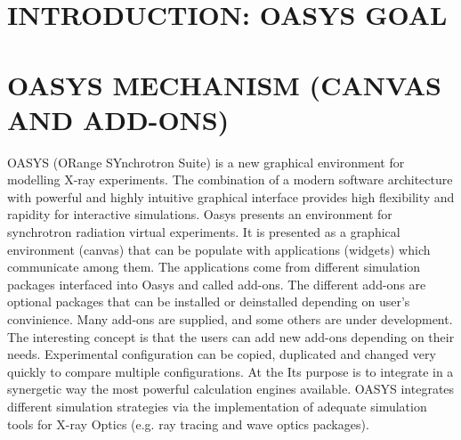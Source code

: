 \documentclass{aip-cp}
\begin{document}
\section{INTRODUCTION: OASYS GOAL}

\section{OASYS MECHANISM (CANVAS AND ADD-ONS)}
OASYS (ORange SYnchrotron Suite) \cite{mandel_wolf}  is a new graphical environment for modelling X-ray experiments. The combination of a modern  software architecture with powerful and highly intuitive graphical interface provides high flexibility and rapidity for interactive simulations. Oasys presents an environment for synchrotron radiation virtual experiments. It is presented as a graphical environment (canvas) that can be populate with applications (widgets) which communicate among them. The applications come from different simulation packages interfaced into Oasys and called add-ons. The different add-ons are optional packages that can be installed or deinstalled depending on user's convinience. Many add-ons are supplied, and some others are under development. The interesting concept is that the users can add new add-ons depending on their needs. Experimental configuration can be copied, duplicated and changed very quickly to compare multiple configurations. At the Its purpose is to integrate in a synergetic way the most powerful calculation engines available. OASYS integrates different simulation strategies via the implementation of adequate simulation tools for X-ray Optics (e.g. ray tracing and wave optics packages). 
\end{document}
